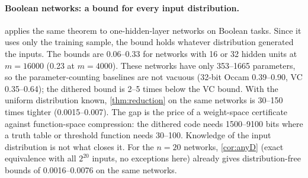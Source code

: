 \paragraph{Boolean networks: a bound for every input distribution.}  applies the same theorem to one-hidden-layer networks on Boolean tasks. Since it uses only the training sample, the bound holds whatever distribution generated the inputs. The bounds are 0.06--0.33 for networks with 16 or 32 hidden units at $m=16000$ (0.23 at $m=4000$). These networks have only 353--1665 parameters, so the parameter-counting baselines are not vacuous (32-bit Occam 0.39--0.90, VC 0.35--0.64); the dithered bound is 2--5 times below the VC bound. With the uniform distribution known, \cref{thm:reduction} on the same networks is 30--150 times tighter (0.0015--0.007). The gap is the price of a weight-space certificate against function-space compression: the dithered code needs 1500--9100 bits where a truth table or threshold function needs 30--100. Knowledge of the input distribution is not what closes it. For the $n=20$ networks, \cref{cor:anyD} (exact equivalence with all $2^{20}$ inputs, no exceptions here) already gives distribution-free bounds of 0.0016--0.0076 on the same networks.


